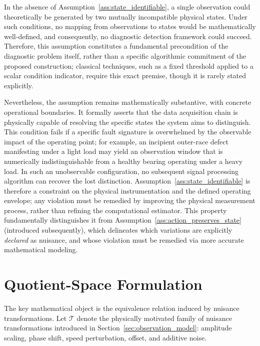 \documentclass[a4paper]{cas-sc}
\begin{document}
In the absence of Assumption~\ref{ass:state_identifiable}, a single observation could theoretically be generated by two mutually incompatible physical states. Under such conditions, no mapping from observations to states would be mathematically well-defined, and consequently, no diagnostic detection framework could succeed. Therefore, this assumption constitutes a fundamental precondition of the diagnostic problem itself, rather than a specific algorithmic commitment of the proposed construction; classical techniques, such as a fixed threshold applied to a scalar condition indicator, require this exact premise, though it is rarely stated explicitly.

Nevertheless, the assumption remains mathematically substantive, with concrete operational boundaries. It formally asserts that the data acquisition chain is physically capable of resolving the specific states the system aims to distinguish. This condition fails if a specific fault signature is overwhelmed by the observable impact of the operating point; for example, an incipient outer-race defect manifesting under a light load may yield an observation window that is numerically indistinguishable from a healthy bearing operating under a heavy load. In such an unobservable configuration, no subsequent signal processing algorithm can recover the lost distinction. Assumption~\ref{ass:state_identifiable} is therefore a constraint on the physical instrumentation and the defined operating envelope; any violation must be remedied by improving the physical measurement process, rather than refining the computational estimator. This property fundamentally distinguishes it from Assumption~\ref{ass:action_preserves_state} (introduced subsequently), which delineates which variations are explicitly \emph{declared} as nuisance, and whose violation must be remedied via more accurate mathematical modeling.

\section{Quotient-Space Formulation}
\label{sec:quotient_formulation}

The key mathematical object is the equivalence relation induced by nuisance
transformations. Let \(\mathcal{T}\) denote the physically motivated family
of nuisance transformations introduced in
Section~\ref{sec:observation_model}: amplitude scaling, phase shift, speed
perturbation, offset, and additive noise.
\end{document}

